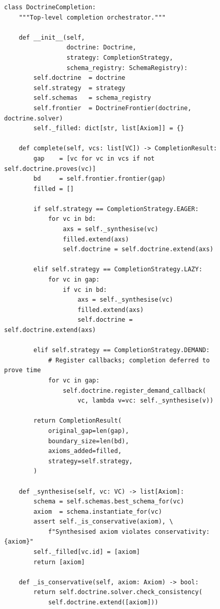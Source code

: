 \documentclass[11pt]{article}
\newcommand{\DoctrineCompletion}{\textsc{DoctrineCompletion}}
\begin{document}
\begin{figure}[H]
\begin{lstlisting}[style=jugeo-python, caption={\DoctrineCompletion.complete},
                   label=alg:completion]
class DoctrineCompletion:
    """Top-level completion orchestrator."""

    def __init__(self,
                 doctrine: Doctrine,
                 strategy: CompletionStrategy,
                 schema_registry: SchemaRegistry):
        self.doctrine  = doctrine
        self.strategy  = strategy
        self.schemas   = schema_registry
        self.frontier  = DoctrineFrontier(doctrine, doctrine.solver)
        self._filled: dict[str, list[Axiom]] = {}

    def complete(self, vcs: list[VC]) -> CompletionResult:
        gap    = [vc for vc in vcs if not self.doctrine.proves(vc)]
        bd     = self.frontier.frontier(gap)
        filled = []

        if self.strategy == CompletionStrategy.EAGER:
            for vc in bd:
                axs = self._synthesise(vc)
                filled.extend(axs)
                self.doctrine = self.doctrine.extend(axs)

        elif self.strategy == CompletionStrategy.LAZY:
            for vc in gap:
                if vc in bd:
                    axs = self._synthesise(vc)
                    filled.extend(axs)
                    self.doctrine = self.doctrine.extend(axs)

        elif self.strategy == CompletionStrategy.DEMAND:
            # Register callbacks; completion deferred to prove time
            for vc in gap:
                self.doctrine.register_demand_callback(
                    vc, lambda v=vc: self._synthesise(v))

        return CompletionResult(
            original_gap=len(gap),
            boundary_size=len(bd),
            axioms_added=filled,
            strategy=self.strategy,
        )

    def _synthesise(self, vc: VC) -> list[Axiom]:
        schema = self.schemas.best_schema_for(vc)
        axiom  = schema.instantiate_for(vc)
        assert self._is_conservative(axiom), \
            f"Synthesised axiom violates conservativity: {axiom}"
        self._filled[vc.id] = [axiom]
        return [axiom]

    def _is_conservative(self, axiom: Axiom) -> bool:
        return self.doctrine.solver.check_consistency(
            self.doctrine.extend([axiom]))
\end{lstlisting}
\end{figure}
\end{document}
